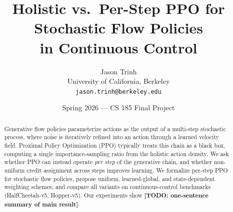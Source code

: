 \documentclass[11pt]{article}
\title{Holistic vs.\ Per-Step PPO for Stochastic Flow Policies\\in Continuous Control}
\author{
  Jason Trinh \\
  University of California, Berkeley \\
  \texttt{jason.trinh@berkeley.edu}
}
\date{Spring 2026 --- CS 185 Final Project}
\newcommand{\todo}[1]{{\color{red}\textbf{[TODO: #1]}}}
\begin{document}
\maketitle

\begin{abstract}
Generative flow policies parameterize actions as the output of a multi-step
stochastic process, where noise is iteratively refined into an action through a
learned velocity field.  Proximal Policy Optimization (PPO) typically treats this
chain as a black box, computing a single importance-sampling ratio from the
holistic action density.  We ask whether PPO can instead operate \emph{per step}
of the generative chain, and whether non-uniform credit assignment across steps
improves learning.  We formalize per-step PPO for stochastic flow policies,
propose uniform, learned-global, and state-dependent weighting schemes, and
compare all variants on continuous-control benchmarks (HalfCheetah-v5,
Hopper-v5).  Our experiments show \todo{one-sentence summary of main result}.
\end{abstract}










\end{document}
